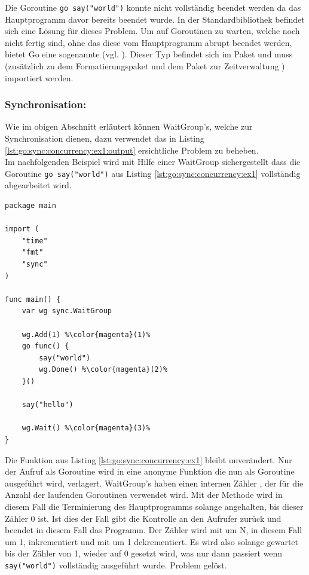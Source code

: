 Die Goroutine \verb|go say("world")| konnte nicht vollständig beendet werden da das Hauptprogramm  davor bereits beendet wurde. In der Standardbibliothek befindet sich eine Lösung für dieses Problem. Um auf Goroutinen zu warten, welche noch nicht fertig sind, ohne das diese vom Hauptprogramm abrupt beendet werden, bietet Go eine sogenannte  (vgl. \cite{go:waitgroup}). Dieser Typ befindet sich im  Paket und muss (zusätzlich zu dem Formatierungspaket  und dem Paket zur Zeitverwaltung ) importiert werden. 

\subsubsection{Synchronisation: }
Wie im obigen Abschnitt erläutert können WaitGroup's, welche zur Synchronisation dienen, dazu verwendet das in Listing \ref{lst:go:sync:concurrency:ex1:output} ersichtliche Problem zu beheben.\\
Im nachfolgenden Beispiel wird mit Hilfe einer WaitGroup sichergestellt dass die Goroutine \verb|go say("world")| aus Listing \ref{lst:go:sync:concurrency:ex1} vollständig abgearbeitet wird.

\begin{minipage}[c]{\linewidth}
\begin{lstlisting}[style=goMono,caption={Beispiel Goroutine: Synchronisation mittels \mono{sync.WaitGroup}}, label={lst:go:sync:concurrency:ex2}]
package main

import (
    "time"
    "fmt"
    "sync"
)

func main() {
    var wg sync.WaitGroup 

    wg.Add(1) %\color{magenta}(1)%
    go func() {
        say("world")
        wg.Done() %\color{magenta}(2)%
    }()
    
    say("hello")
    
    wg.Wait() %\color{magenta}(3)%
}
\end{lstlisting}
\end{minipage}
Die Funktion \frqq{}\flqq{} aus Listing \ref{lst:go:sync:concurrency:ex1} bleibt unverändert. Nur der Aufruf als Goroutine wird in eine anonyme Funktion die nun als Goroutine ausgeführt wird, verlagert. WaitGroup's haben einen internen Zähler , der für die Anzahl der laufenden Goroutinen verwendet wird. Mit der Methode  wird in diesem Fall die Terminierung des Hauptprogramms solange angehalten, bis dieser Zähler 0 ist. Ist dies der Fall gibt  die Kontrolle an den Aufrufer zurück und beendet in diesem Fall das Programm. Der Zähler wird mit  um N, in diesem Fall um 1, inkrementiert und mit  um 1 dekrementiert. Es wird also solange gewartet  bis der Zähler von 1, wieder auf 0 gesetzt wird, was nur dann passiert wenn \frqq{}\verb|say("world")|\flqq{} vollständig ausgeführt wurde. Problem gelöst.  
